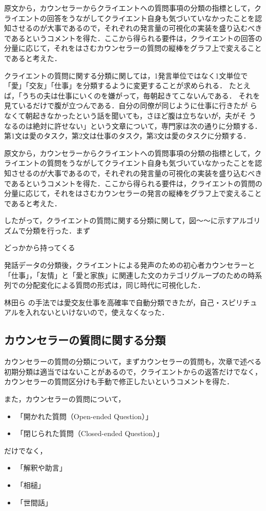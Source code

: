 \documentclass[shuuron]{kuee}
\begin{document}
原文から，カウンセラーからクライエントへの質問事項の分類の指標として，クライエントの回答をうながしてクライエント自身も気づいていなかったことを認知させるのが大事であるので，それぞれの発言量の可視化の実装を盛り込むべきであるというコメントを得た．ここから得られる要件は，クライエントの回答の分量に応じて，それをはさむカウンセラーの質問の縦棒をグラフ上で変えることであると考えた．

クライエントの質問に関する分類に関しては，1発言単位ではなく1文単位で「愛」「交友」「仕事」を分類するように変更することが求められる．
たとえば，「うちの夫は仕事にいくのを嫌がって，毎朝起きてこないんである．
それを見ているだけで腹が立つんである．自分の同僚が同じように仕事に行きたが
らなくて朝起きなかったという話を聞いても，さほど腹は立ちないが，夫がそ
うなるのは絶対に許せない」という文章について，専門家は次の通りに分類する．第1文は愛のタスク，第2文は仕事のタスク，第3文は愛のタスクに分類する．

原文から，カウンセラーからクライエントへの質問事項の分類の指標として，クライエントの質問をうながしてクライエント自身も気づいていなかったことを認知させるのが大事であるので，それぞれの発言量の可視化の実装を盛り込むべきであるというコメントを得た．ここから得られる要件は，クライエントの質問の分量に応じて，それをはさむカウンセラーの発言の縦棒をグラフ上で変えることであると考えた．

したがって，クライエントの質問に関する分類に関して，図〜〜に示すアルゴリズムで分類を行った．まず

どっかから持ってくる

発話データの分類後，クライエントによる発声のための初心者カウンセラーと「仕事」，「友情」と「愛と家族」に関連した文のカテゴリグループのための時系列での分配変化による質問の形式は，同じ時代に可視化した．

林田ら\cite{hayashidaJp} \cite{hayashidaEn}の手法では愛交友仕事を高確率で自動分類できたが，自己・スピリチュアルを入れないといけないので，使えなくなった．

\subsection{カウンセラーの質問に関する分類}

カウンセラーの質問の分類について，まずカウンセラーの質問も，次章で述べる初期分類は適当ではないことがあるので，クライエントからの返答だけでなく，カウンセラーの質問区分けも手動で修正したいというコメントを得た．

また，カウンセラーの質問について，
\begin{itemize}
  \item 「開かれた質問（Open-ended Question）」
  \item 「閉じられた質問（Closed-ended Question）」

\end{itemize}
だけでなく，
\begin{itemize}
  \item 「解釈や助言」
  \item 「相槌」
  \item 「世間話」
\end{itemize}
\end{document}
